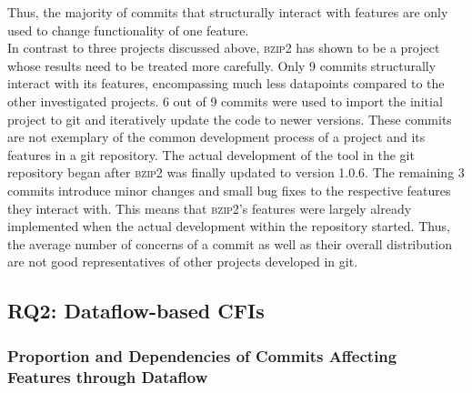 Thus, the majority of commits that structurally interact with features are only used to change functionality of one feature. \\
In contrast to three projects discussed above, \textsc{bzip2} has shown to be a project whose results need to be treated more carefully.
Only 9 commits structurally interact with its features, encompassing much less datapoints compared to the other investigated projects.
6 out of 9 commits were used to import the initial project to git and iteratively update the code to newer versions.
These commits are not exemplary of the common development process of a project and its features in a git repository.
The actual development of the tool in the git repository began after \textsc{bzip2} was finally updated to version 1.0.6.
The remaining 3 commits introduce minor changes and small bug fixes to the respective features they interact with.
This means that \textsc{bzip2}'s features were largely already implemented when the actual development within the repository started.
Thus, the average number of concerns of a commit as well as their overall distribution are not good representatives of other projects developed in git. 

\subsection*{\textbf{RQ2: Dataflow-based CFIs}}\label{sec:disc_df_cfis}

\subsubsection*{Proportion and Dependencies of Commits Affecting Features through Dataflow}

